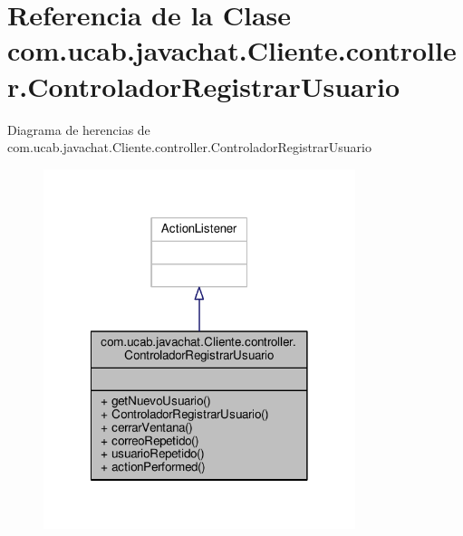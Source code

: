 \hypertarget{classcom_1_1ucab_1_1javachat_1_1_cliente_1_1controller_1_1_controlador_registrar_usuario}{\section{Referencia de la Clase com.\-ucab.\-javachat.\-Cliente.\-controller.\-Controlador\-Registrar\-Usuario}
\label{classcom_1_1ucab_1_1javachat_1_1_cliente_1_1controller_1_1_controlador_registrar_usuario}
}


Diagrama de herencias de com.\-ucab.\-javachat.\-Cliente.\-controller.\-Controlador\-Registrar\-Usuario
\nopagebreak
\begin{figure}[H]
\begin{center}
\leavevmode
\includegraphics[width=258pt]{d4/d15/classcom_1_1ucab_1_1javachat_1_1_cliente_1_1controller_1_1_controlador_registrar_usuario__inherit__graph}
\end{center}
\end{figure}


